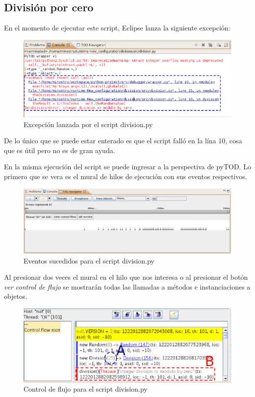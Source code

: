 \documentclass[12pt,legalpaper]{report}
\begin{document}
		\subsection{División por cero}
		
En el momento de ejecutar este script, Eclipse lanza la siguiente excepción:

\begin{figure}[h]
	\centering
	\includegraphics[scale=0.6]{images/division/Exception.eps}
	\caption{Excepción lanzada por el script division.py}
\end{figure}

De lo único que se puede estar enterado es que el script falló en la lína 10, cosa que es útil pero no es de gran ayuda.

En la misma ejecución del script se puede ingresar a la perspectiva de pyTOD.  Lo primero que se vera es el mural de hilos de ejecución con sus eventos respectivos.

\begin{figure}[h]
	\centering
	\includegraphics[scale=0.5]{images/division/threadMurals.eps}
	\caption{Eventos sucedidos para el script division.py}
\end{figure}

Al presionar dos veces el mural en el hilo que nos interesa o al presionar el botón \textit{ver control de flujo} se mostrarán todas las llamadas a métodos e instanciaciones a objetos.

\begin{figure}[h]
	\centering
	\includegraphics[scale=0.8]{images/division/controlFlow.eps}
	\caption{Control de flujo para el script division.py}
\end{figure}
\end{document}
